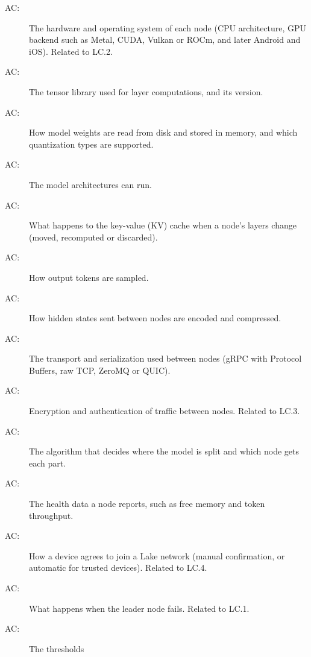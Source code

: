\documentclass[12pt, titlepage]{article}
\newcounter{acnum}
\newcommand{\actheacnum}{AC\theacnum}
\begin{document}
\begin{description}
\item[ \actheacnum \label{acHardware}:] The hardware and
  operating system of each node (CPU architecture, GPU backend such as Metal,
  CUDA, Vulkan or ROCm, and later Android and iOS). Related to LC.2.
\item[ \actheacnum \label{acTensorLib}:] The tensor
  library used for layer computations, and its version.
\item[ \actheacnum \label{acWeights}:] How model weights
  are read from disk and stored in memory, and which quantization types are
  supported.
\item[ \actheacnum \label{acArch}:] The model
  architectures \progname{} can run.
\item[ \actheacnum \label{acKV}:] What happens to the
  key-value (KV) cache when a node's layers change (moved, recomputed or
  discarded).
\item[ \actheacnum \label{acSampling}:] How output tokens
  are sampled.
\item[ \actheacnum \label{acTensorFormat}:] How hidden states
  sent between nodes are encoded and compressed.
\item[ \actheacnum \label{acTransport}:] The transport and
  serialization used between nodes (gRPC with Protocol Buffers, raw TCP,
  ZeroMQ or QUIC).
\item[ \actheacnum \label{acSecurity}:] Encryption and
  authentication of traffic between nodes. Related to LC.3.
\item[ \actheacnum \label{acSplit}:] The algorithm that
  decides where the model is split and which node gets each part.
\item[ \actheacnum \label{acHealth}:] The health data a
  node reports, such as free memory and token throughput.
\item[ \actheacnum \label{acJoin}:] How a device agrees to
  join a Lake network (manual confirmation, or automatic for trusted devices).
  Related to LC.4.
\item[ \actheacnum \label{acLeader}:] What happens when the
  leader node fails. Related to LC.1.
\item[ \actheacnum \label{acThresholds}:] The thresholds

\end{description}
\end{document}
